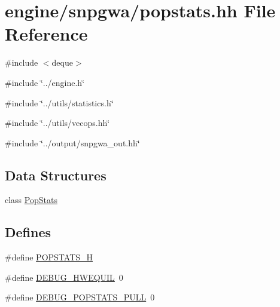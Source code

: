 \hypertarget{popstats_8hh}{
\section{engine/snpgwa/popstats.hh File Reference}
\label{popstats_8hh}
}
{\ttfamily \#include $<$deque$>$}\par
{\ttfamily \#include \char`\"{}../engine.h\char`\"{}}\par
{\ttfamily \#include \char`\"{}../utils/statistics.h\char`\"{}}\par
{\ttfamily \#include \char`\"{}../utils/vecops.hh\char`\"{}}\par
{\ttfamily \#include \char`\"{}../output/snpgwa\_\-out.hh\char`\"{}}\par
\subsection*{Data Structures}
\begin{DoxyCompactItemize}
\item 
class \hyperlink{classPopStats}{PopStats}
\end{DoxyCompactItemize}
\subsection*{Defines}
\begin{DoxyCompactItemize}
\item 
\#define \hyperlink{popstats_8hh_aa9ff7a6aa31d770b2807ba4da745ade6}{POPSTATS\_\-H}
\item 
\#define \hyperlink{popstats_8hh_ac6f1bc4d7682b5ee9dd2e5517f00e82e}{DEBUG\_\-HWEQUIL}~0
\item 
\#define \hyperlink{popstats_8hh_a18a4c18a4e08244f3363161a13c363ed}{DEBUG\_\-POPSTATS\_\-PULL}~0
\end{DoxyCompactItemize}


